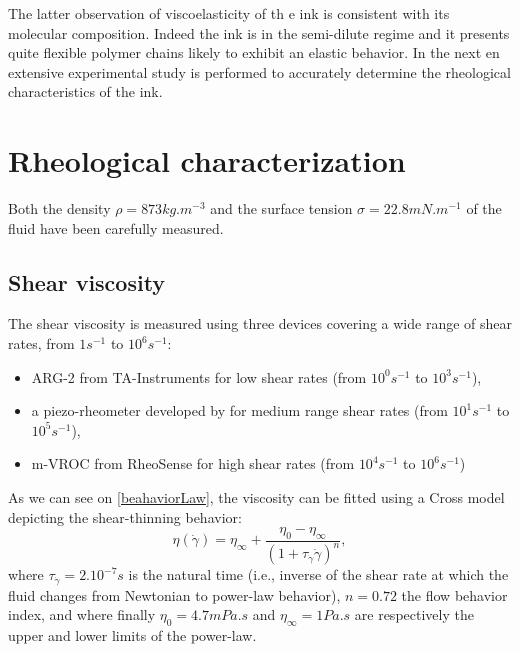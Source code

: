 \documentclass[twocolumn,10pt]{asme2ej}
\begin{document}
 
The latter observation of viscoelasticity of th e ink is consistent with its molecular composition. Indeed the ink is in the semi-dilute regime and it presents quite flexible polymer chains likely to exhibit an elastic behavior. In the next en extensive experimental study is performed to accurately determine the rheological characteristics of the ink.












\section{Rheological characterization}
Both the density $\rho = 873 kg.m^{-3}$ and the surface tension $\sigma = 22.8 mN.m^{-1}$ of the fluid have been carefully measured.

\subsection{Shear viscosity}
The shear viscosity is measured using three devices covering a wide range of shear rates, from $1s^{-1}$ to $10^6 s^{-1}$:
\begin{itemize}
    \item ARG-2 from TA-Instruments for low shear rates (from $10^0 s^{-1}$ to $10^3 s^{-1}$),
    \item a piezo-rheometer developed by \cite{buchanan2005high} for medium range shear rates (from $10^1 s^{-1}$ to $10^5 s^{-1}$),
    \item m-VROC from RheoSense for high shear rates (from $10^4 s^{-1}$ to $10^6 s^{-1}$)
\end{itemize}
As we can see on \ref{beahaviorLaw}, the viscosity can be fitted using a Cross model depicting the shear-thinning behavior:
\begin{equation}
    \eta(\dot{\gamma})=\eta_{\infty} + \frac{\eta_0 - \eta_{\infty}}{(1+\tau_{\dot{\gamma}} \dot{\gamma})^{n}},
    \label{crossEq}
  \end{equation}
where $\tau_{\dot{\gamma}}=2.10^{-7}s$ is the natural time (i.e., inverse of the shear rate at which the fluid changes from Newtonian to power-law behavior), $n=0.72$ the flow behavior index, and where finally $\eta_0=4.7 mPa.s $ and $\eta_\infty = 1 Pa.s$ are respectively the upper and lower limits of the power-law.
\end{document}
